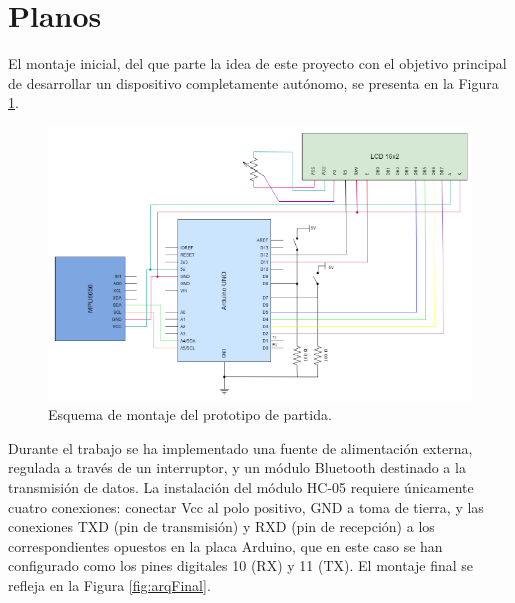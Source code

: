 
\section{Planos}
El montaje inicial, del que parte la idea de este proyecto con el objetivo principal de desarrollar un dispositivo completamente autónomo, se presenta en la Figura \ref{fig:arqInicio}.

\begin{figure}[h]
    \centering
    \includegraphics[width=1\textwidth]{img/E1_Planos/planoSara.png}
    \caption{Esquema de montaje del prototipo de partida. \cite{saragonz91:online}}
    \label{fig:arqInicio}
\end{figure}

Durante el trabajo se ha implementado una fuente de alimentación externa, regulada a través de un interruptor, y un módulo Bluetooth destinado a la transmisión de datos. La instalación del módulo HC-05 requiere únicamente cuatro conexiones: conectar Vcc al polo positivo, GND a toma de tierra, y las conexiones TXD (pin de transmisión) y RXD (pin de recepción) a los correspondientes opuestos en la placa Arduino, que en este caso se han configurado como los pines digitales 10 (RX) y 11 (TX). El montaje final se refleja en la Figura \ref{fig:arqFinal}.

